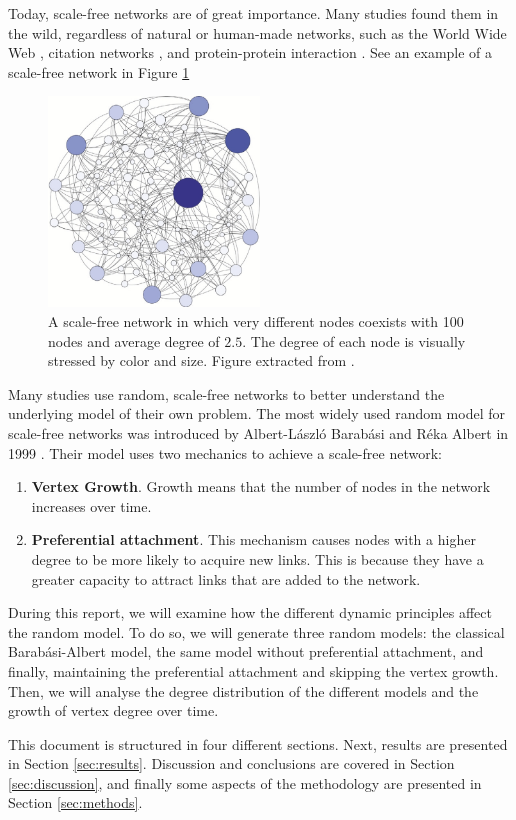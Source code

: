 Today, scale-free networks are of great importance. Many studies found them in the wild, regardless of natural or human-made networks, such as the World Wide Web \cite{Barabsi2000}, citation networks \cite{Wang2010}, and protein-protein interaction \cite{Nacher2009}.  See an example of a scale-free network in Figure \ref{fig:scale-free-network}

\begin{figure}[!htb]
    \centering
    \includegraphics[width=0.5\textwidth]{figures/scale-free-network.jpg}
    \caption{A scale-free network in which very different nodes coexists with 100 nodes and average degree of $2.5$. The degree of each node is visually stressed by color and size. Figure extracted from \cite{Baronchelli2013}.}
    \label{fig:scale-free-network}
\end{figure}

Many studies use random, scale-free networks to better understand the underlying model of their own problem. The most widely used random model for scale-free networks was introduced by Albert-László Barabási and Réka Albert in 1999 \cite{Barabasi1999}. Their model uses two mechanics to achieve a scale-free network:
\begin{enumerate}[I]
    \item \textbf{Vertex Growth}. Growth means that the number of nodes in the network increases over time.
    \item \textbf{Preferential attachment}. This mechanism causes nodes with a higher degree to be more likely to acquire new links. This is because they have a greater capacity to attract links that are added to the network.
\end{enumerate}

During this report, we will examine how the different dynamic principles affect the random model. To do so, we will generate three random models: the classical Barabási-Albert model, the same model without preferential attachment, and finally, maintaining the preferential attachment and skipping the vertex growth. Then, we will analyse the degree distribution of the different models and the growth of vertex degree over time.

This document is structured in four different sections. Next, results are presented in Section \ref{sec:results}. Discussion and conclusions are covered in Section \ref{sec:discussion}, and finally some aspects of the methodology are presented in Section \ref{sec:methods}.